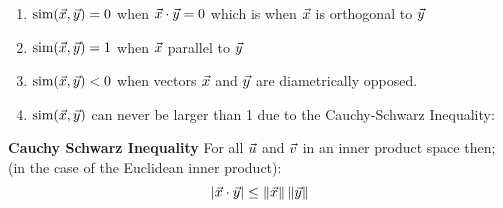 \begin{enumerate}
	\item $\text{sim}(\vec{x}, \vec{y}) = 0$ when $\vec{x} \cdot \vec{y} = 0$ which is when $\vec{x}$ is orthogonal to $\vec{y}$
	\item $\text{sim}(\vec{x}, \vec{y}) = 1$ when $\vec{x}$ parallel to $\vec{y}$
	\item $\text{sim}(\vec{x}, \vec{y}) < 0$ when vectors $\vec{x}$ and $\vec{y}$ are diametrically opposed. 
	\item $\text{sim}(\vec{x}, \vec{y})$ can never be larger than 1 due to the Cauchy-Schwarz Inequality:
\end{enumerate}

\begin{dBox}
	\textbf{Cauchy Schwarz Inequality} 
	For all $\vec{u}$ and $\vec{v}$ in an inner product space then; (in the case of the Euclidean inner product):
	\begin{equation}
		|\vec{x} \cdot \vec{y}| \leq \left\lVert\vec{x}\right\rVert\left\lVert\vec{y}\right\rVert
		\label{<+label+>}
	\end{equation}

\end{dBox}
